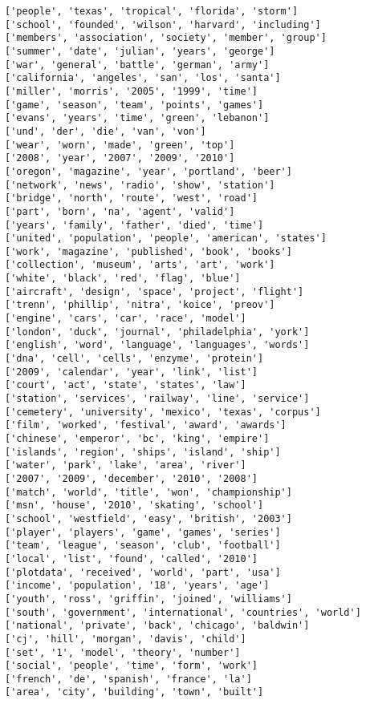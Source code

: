 \documentclass[11pt]{ctexart}
\begin{document}
    \begin{Verbatim}[commandchars=\\\{\}]
['people', 'texas', 'tropical', 'florida', 'storm']
['school', 'founded', 'wilson', 'harvard', 'including']
['members', 'association', 'society', 'member', 'group']
['summer', 'date', 'julian', 'years', 'george']
['war', 'general', 'battle', 'german', 'army']
['california', 'angeles', 'san', 'los', 'santa']
['miller', 'morris', '2005', '1999', 'time']
['game', 'season', 'team', 'points', 'games']
['evans', 'years', 'time', 'green', 'lebanon']
['und', 'der', 'die', 'van', 'von']
['wear', 'worn', 'made', 'green', 'top']
['2008', 'year', '2007', '2009', '2010']
['oregon', 'magazine', 'year', 'portland', 'beer']
['network', 'news', 'radio', 'show', 'station']
['bridge', 'north', 'route', 'west', 'road']
['part', 'born', 'na', 'agent', 'valid']
['years', 'family', 'father', 'died', 'time']
['united', 'population', 'people', 'american', 'states']
['work', 'magazine', 'published', 'book', 'books']
['collection', 'museum', 'arts', 'art', 'work']
['white', 'black', 'red', 'flag', 'blue']
['aircraft', 'design', 'space', 'project', 'flight']
['trenn', 'phillip', 'nitra', 'koice', 'preov']
['engine', 'cars', 'car', 'race', 'model']
['london', 'duck', 'journal', 'philadelphia', 'york']
['english', 'word', 'language', 'languages', 'words']
['dna', 'cell', 'cells', 'enzyme', 'protein']
['2009', 'calendar', 'year', 'link', 'list']
['court', 'act', 'state', 'states', 'law']
['station', 'services', 'railway', 'line', 'service']
['cemetery', 'university', 'mexico', 'texas', 'corpus']
['film', 'worked', 'festival', 'award', 'awards']
['chinese', 'emperor', 'bc', 'king', 'empire']
['islands', 'region', 'ships', 'island', 'ship']
['water', 'park', 'lake', 'area', 'river']
['2007', '2009', 'december', '2010', '2008']
['match', 'world', 'title', 'won', 'championship']
['msn', 'house', '2010', 'skating', 'school']
['school', 'westfield', 'easy', 'british', '2003']
['player', 'players', 'game', 'games', 'series']
['team', 'league', 'season', 'club', 'football']
['local', 'list', 'found', 'called', '2010']
['plotdata', 'received', 'world', 'part', 'usa']
['income', 'population', '18', 'years', 'age']
['youth', 'ross', 'griffin', 'joined', 'williams']
['south', 'government', 'international', 'countries', 'world']
['national', 'private', 'back', 'chicago', 'baldwin']
['cj', 'hill', 'morgan', 'davis', 'child']
['set', '1', 'model', 'theory', 'number']
['social', 'people', 'time', 'form', 'work']
['french', 'de', 'spanish', 'france', 'la']
['area', 'city', 'building', 'town', 'built']

\end{Verbatim}
\end{document}
